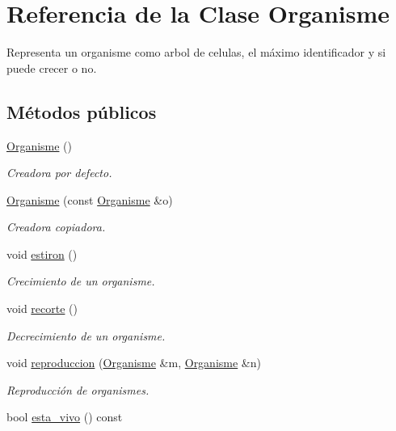 \hypertarget{class_organisme}{\section{Referencia de la Clase Organisme}
\label{class_organisme}
}


Representa un organisme como arbol de celulas, el máximo identificador y si puede crecer o no.  


\subsection*{Métodos públicos}
\begin{DoxyCompactItemize}
\item 
\hyperlink{class_organisme_a5624eb8adf14bc96d783067d51605fbd}{Organisme} ()
\begin{DoxyCompactList}\small\item\em Creadora por defecto. \end{DoxyCompactList}\item 
\hyperlink{class_organisme_a185bb1fe4199489f8c36b6ad53bdd562}{Organisme} (const \hyperlink{class_organisme}{Organisme} \&o)
\begin{DoxyCompactList}\small\item\em Creadora copiadora. \end{DoxyCompactList}\item 
void \hyperlink{class_organisme_acdc2be53a7fabf324235c19b313bf662}{estiron} ()
\begin{DoxyCompactList}\small\item\em Crecimiento de un organisme. \end{DoxyCompactList}\item 
void \hyperlink{class_organisme_ac45268062b8cd33a3a3ab5e70cb2403d}{recorte} ()
\begin{DoxyCompactList}\small\item\em Decrecimiento de un organisme. \end{DoxyCompactList}\item 
void \hyperlink{class_organisme_acaa3d638061c17bcabf92e391867e0d6}{reproduccion} (\hyperlink{class_organisme}{Organisme} \&m, \hyperlink{class_organisme}{Organisme} \&n)
\begin{DoxyCompactList}\small\item\em Reproducción de organismes. \end{DoxyCompactList}\item 
bool \hyperlink{class_organisme_ac6f8f199e61636ce7a6423cddc14561d}{esta\-\_\-vivo} () const 

\end{DoxyCompactItemize}
